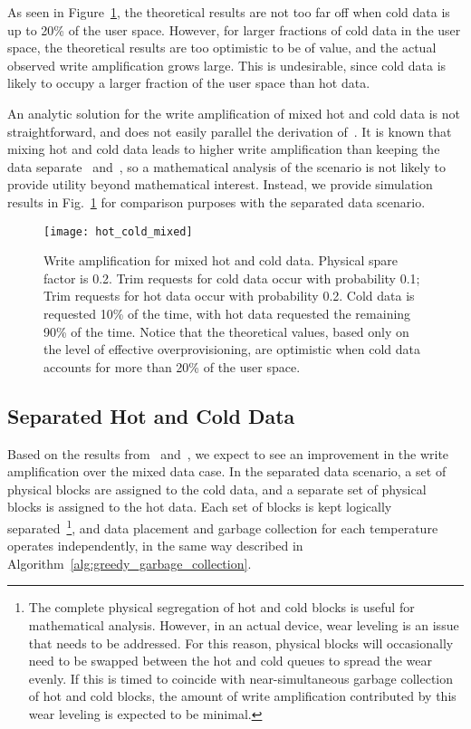 \documentclass[prodmode,acmtos]{acmsmall}
\begin{document}
As seen in Figure~\ref{fig:hot_cold_write_amp}, the theoretical results are not too far off when cold data is up to 20\% of the user space.  However, for larger fractions of cold data in the user space, the theoretical results are too optimistic to be of value, and the actual observed write amplification grows large. This is undesirable, since cold data is likely to occupy a larger fraction of the user space than hot data.

An analytic solution for the write amplification of mixed hot and cold data is not straightforward, and does not easily parallel the derivation of~.  It is known that mixing hot and cold data leads to higher write amplification than keeping the data separate~ and~, so a mathematical analysis of the scenario is not likely to provide utility beyond mathematical interest.  Instead, we provide simulation results in Fig.~\ref{fig:hot_cold_write_amp} for comparison purposes with the separated data scenario.

\begin{figure}
\centerline{\texttt{[image: hot\_cold\_mixed]}}
\caption{Write amplification for mixed hot and cold data.  Physical spare factor is 0.2.  Trim requests for cold data occur with probability 0.1; Trim requests for hot data occur with probability 0.2.  Cold data is requested 10\% of the time, with hot data requested the remaining 90\% of the time.  Notice that the theoretical values, based only on the level of effective overprovisioning, are optimistic when cold data accounts for more than 20\% of the user space.}
\label{fig:hot_cold_write_amp}
\end{figure}


\subsection{Separated Hot and Cold Data}\label{sec:separated_hot_cold}
Based on the results from~ and~, we expect to see an improvement in the write amplification over the mixed data case.  In the separated data scenario, a set of physical blocks are assigned to the cold data, and a separate set of physical blocks is assigned to the hot data.  Each set of blocks is kept logically separated~\footnote{The complete physical segregation of hot and cold blocks is useful for mathematical analysis.  However, in an actual device, wear leveling is an issue that needs to be addressed.  For this reason, physical blocks will occasionally need to be swapped between the hot and cold queues to spread the wear evenly.  If this is timed to coincide with near-simultaneous garbage collection of hot and cold blocks, the amount of write amplification contributed by this wear leveling is expected to be minimal.}, and data placement and garbage collection for each temperature operates independently, in the same way described in Algorithm~\ref{alg:greedy_garbage_collection}.
\end{document}
